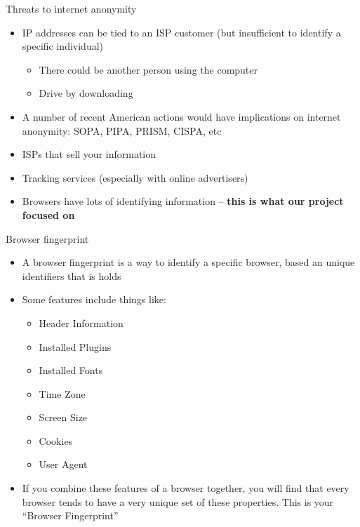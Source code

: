 \begin{frame}[fragile,t]{Threats to internet anonymity}
	\begin{itemize}
		\item IP addresses can be tied to an ISP customer (but insufficient to identify a specific individual)
		\begin{itemize}
			\item There could be another person using the computer
			\item Drive by downloading
		\end{itemize}
		\item A number of recent American actions would have implications on internet anonymity: SOPA, PIPA, PRISM, CISPA, etc
		\item ISPs that sell your information
		\item Tracking services (especially with online advertisers)
		\item Browsers have lots of identifying information -- \textbf{this is what our project focused on}
	\end{itemize}
\end{frame}

\begin{frame}[fragile,t]{Browser fingerprint}
	\begin{itemize}
		\item A browser fingerprint is a way to identify a specific browser, based an unique identifiers that is holds
		\item Some features include things like:
		\begin{itemize}
			\item Header Information
			\item Installed Plugins
			\item Installed Fonts
			\item Time Zone
			\item Screen Size
			\item Cookies
			\item User Agent
		\end{itemize}
		\item If you combine these features of a browser together, you will find that every browser tends to have a very unique set of these properties. This is your ``Browser Fingerprint''
	\end{itemize}
	
\end{frame}



